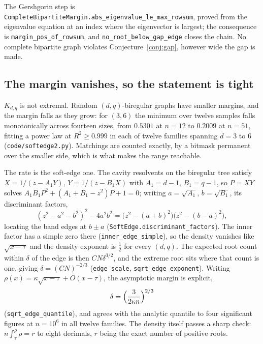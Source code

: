 \documentclass[11pt]{article}
\theoremstyle{remark}
\begin{document}
The Gershgorin step is \texttt{CompleteBipartiteMargin.abs\_eigenvalue\_le\_max\_rowsum}, proved
from the eigenvalue equation at an index where the eigenvector is largest; the consequence is
\texttt{margin\_pos\_of\_rowsum}, and \texttt{no\_root\_below\_gap\_edge} closes the chain. No
complete bipartite graph violates Conjecture~\ref{conj:gap}, however wide the gap is made.

\subsection{The margin vanishes, so the statement is tight}\label{sec:softedge}

$K_{d,q}$ is not extremal. Random $(d,q)$-biregular graphs have smaller margins, and the margin
falls as they grow: for $(3,6)$ the minimum over twelve samples falls monotonically across
fourteen sizes, from $0.5301$ at $n=12$ to $0.2009$ at $n=51$, fitting a power law at
$R^2\ge0.999$ in each of twelve families spanning $d=3$ to $6$ (\texttt{code/softedge2.py}).
Matchings are counted exactly, by a bitmask permanent over the smaller side, which is what makes
the range reachable.

The rate is the soft-edge one. The cavity resolvents on the biregular tree satisfy
$X=1/(z-A_1Y)$, $Y=1/(z-B_1X)$ with $A_1=d-1$, $B_1=q-1$, so $P=XY$ solves
$A_1B_1P^2+(A_1+B_1-z^2)P+1=0$; writing $a=\sqrt{A_1}$, $b=\sqrt{B_1}$, its discriminant factors,
\begin{equation}\label{eq:disc}
   (z^2-a^2-b^2)^2-4a^2b^2=\bigl(z^2-(a+b)^2\bigr)\bigl(z^2-(b-a)^2\bigr),
\end{equation}
locating the band edges at $b\pm a$ (\texttt{SoftEdge.discriminant\_factors}). The inner factor
has a simple zero there (\texttt{inner\_edge\_simple}), so the density vanishes like
$\sqrt{x-\tau}$ and the density exponent is $\tfrac12$ for every $(d,q)$. The expected root count
within $\delta$ of the edge is then $CN\delta^{3/2}$, and the extreme root sits where that count
is one, giving $\delta=(CN)^{-2/3}$ (\texttt{edge\_scale}, \texttt{sqrt\_edge\_exponent}).
Writing $\rho(x)=\kappa\sqrt{x-\tau}+O(x-\tau)$, the asymptotic margin is explicit,
\begin{equation}\label{eq:constant}
   \delta=\Bigl(\frac{3}{2\kappa n}\Bigr)^{2/3}
\end{equation}
(\texttt{sqrt\_edge\_quantile}), and agrees with the analytic quantile to four significant
figures at $n=10^6$ in all twelve families. The density itself passes a sharp check:
$n\int_\tau^\rho\rho=r$ to eight decimals, $r$ being the exact number of positive roots.
\end{document}
